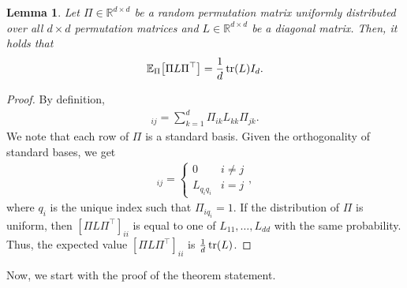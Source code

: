 \documentclass{article}
\newcommand{\R}{\mathbb{R}}
\newcommand{\E}{\mathbb{E}}
\newtheorem{lemma}{Lemma}[subsection]
\begin{document}
\begin{lemma}
\label{lemma: permutation diagonal}
    Let $\Pi \in \R^{d\times d}$ be a random permutation matrix uniformly distributed over all $d\times d$ permutation matrices and $L\in\R^{d\times d}$ be a diagonal matrix.
    Then, it holds that
    \begin{align}
        \E_\Pi\qty[\Pi L \Pi^\top] = \frac{1}{d}\tr(L)I_d.
    \end{align}
\end{lemma}
\begin{proof}
    By definition,
    \begin{align}
        [\Pi L \Pi^\top]_{ij} = \sum_{k=1}^d \Pi_{ik} L_{kk} \Pi_{jk}.
    \end{align}
We note that each row of $\Pi$ is a standard basis.
Given the orthogonality of standard bases, we get
\begin{align}
    [\Pi L \Pi^\top]_{ij} = \begin{cases}
        0 & i\neq j \\
        L_{q_i q_i}  & i=j
    \end{cases},
\end{align}
where $q_i$ is the unique index such that $\Pi_{iq_i} = 1$.
If the distribution of $\Pi$ is uniform, then $[\Pi L \Pi^\top]_{ii}$ is equal to one of $L_{11},\dots, L_{dd}$ with the same probability.
Thus, the expected value  $[\Pi L \Pi^\top]_{ii}$ is $\frac{1}{d} \tr(L)$.
\end{proof}
Now, we start with the proof of the theorem statement.
\end{document}
